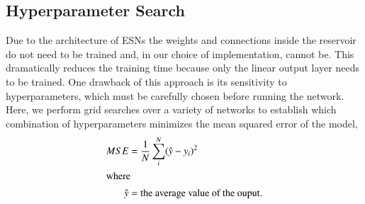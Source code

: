 \subsection{Hyperparameter Search}
Due to the architecture of \acrshort{ESN}s the weights and connections
inside the reservoir do not need to be trained and, in our choice of
implementation, cannot be. This dramatically reduces the training time because
only the linear output layer needs to be trained. One drawback of this approach
is its sensitivity to hyperparameters, which must be carefully chosen before
running the network. Here, we perform grid searches over a variety of networks
to establish which combination of hyperparameters minimizes the mean squared
error of the model,
\begin{align}
	MSE &= \frac{1}{N}\sum_i^N (\hat{y} - y_i)^2\\
	\intertext{where}
	\hat{y} &= \mbox{the average value of the ouput.}\nonumber
\end{align}
